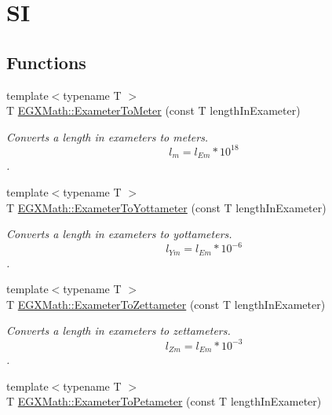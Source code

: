 \hypertarget{group___e_g_x_math-_conversions-_length_conversions-_s_i-_exameter-_s_i}{}\section{SI}
\label{group___e_g_x_math-_conversions-_length_conversions-_s_i-_exameter-_s_i}
\subsection*{Functions}
\begin{DoxyCompactItemize}
\item 
{\footnotesize template$<$typename T $>$ }\\T \mbox{\hyperlink{group___e_g_x_math-_conversions-_length_conversions-_s_i-_exameter-_s_i_ga367c71c371f48790004a1de30a59f2a4}{E\+G\+X\+Math\+::\+Exameter\+To\+Meter}} (const T length\+In\+Exameter)
\begin{DoxyCompactList}\small\item\em Converts a length in exameters to meters. \[ l_{m}=l_{Em} * 10^{18} \]. \end{DoxyCompactList}\item 
{\footnotesize template$<$typename T $>$ }\\T \mbox{\hyperlink{group___e_g_x_math-_conversions-_length_conversions-_s_i-_exameter-_s_i_ga052b009f7705d8ad81083116d15dec65}{E\+G\+X\+Math\+::\+Exameter\+To\+Yottameter}} (const T length\+In\+Exameter)
\begin{DoxyCompactList}\small\item\em Converts a length in exameters to yottameters. \[ l_{Ym}=l_{Em} * 10^{-6} \]. \end{DoxyCompactList}\item 
{\footnotesize template$<$typename T $>$ }\\T \mbox{\hyperlink{group___e_g_x_math-_conversions-_length_conversions-_s_i-_exameter-_s_i_gaa971cb3b6d17c5e7772d180b2606e42b}{E\+G\+X\+Math\+::\+Exameter\+To\+Zettameter}} (const T length\+In\+Exameter)
\begin{DoxyCompactList}\small\item\em Converts a length in exameters to zettameters. \[ l_{Zm}=l_{Em} * 10^{-3} \]. \end{DoxyCompactList}\item 
{\footnotesize template$<$typename T $>$ }\\T \mbox{\hyperlink{group___e_g_x_math-_conversions-_length_conversions-_s_i-_exameter-_s_i_gadf7ed11d79b89826a108cd01e4f67769}{E\+G\+X\+Math\+::\+Exameter\+To\+Petameter}} (const T length\+In\+Exameter)

\end{DoxyCompactItemize}
